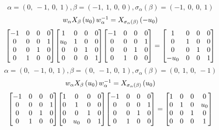 \documentclass[11pt]{article}
\theoremstyle{definition}
\begin{document}
\[
\alpha = \left( 0, \  -1, \  0, \  1\right), \beta = \left( -1, \  1, \  0, \  0\right), \sigma_{\alpha}(\beta) = \left( -1, \  0, \  0, \  1\right)
\]
\[
\scaletoalign{\textwidth}{w_{\alpha} X_{\beta}\left(u_{0}\right) w_{\alpha}^{-1} = X_{\sigma_{\alpha}\left(\beta\right)}\left(- u_{0}\right)}
\]
\[
\scaletoalign{\textwidth}{{\left[\begin{matrix}-1 & 0 & 0 & 0\\0 & 0 & 0 & 1\\0 & 0 & 1 & 0\\0 & 1 & 0 & 0\end{matrix}\right]} {\left[\begin{matrix}1 & 0 & 0 & 0\\u_{0} & 1 & 0 & 0\\0 & 0 & 1 & 0\\0 & 0 & 0 & 1\end{matrix}\right]} {\left[\begin{matrix}-1 & 0 & 0 & 0\\0 & 0 & 0 & 1\\0 & 0 & 1 & 0\\0 & 1 & 0 & 0\end{matrix}\right]} = {\left[\begin{matrix}1 & 0 & 0 & 0\\0 & 1 & 0 & 0\\0 & 0 & 1 & 0\\- u_{0} & 0 & 0 & 1\end{matrix}\right]}}
\]
\[
\alpha = \left( 0, \  -1, \  0, \  1\right), \beta = \left( 0, \  -1, \  0, \  1\right), \sigma_{\alpha}(\beta) = \left( 0, \  1, \  0, \  -1\right)
\]
\[
\scaletoalign{\textwidth}{w_{\alpha} X_{\beta}\left(u_{0}\right) w_{\alpha}^{-1} = X_{\sigma_{\alpha}\left(\beta\right)}\left(u_{0}\right)}
\]
\[
\scaletoalign{\textwidth}{{\left[\begin{matrix}-1 & 0 & 0 & 0\\0 & 0 & 0 & 1\\0 & 0 & 1 & 0\\0 & 1 & 0 & 0\end{matrix}\right]} {\left[\begin{matrix}1 & 0 & 0 & 0\\0 & 1 & 0 & 0\\0 & 0 & 1 & 0\\0 & u_{0} & 0 & 1\end{matrix}\right]} {\left[\begin{matrix}-1 & 0 & 0 & 0\\0 & 0 & 0 & 1\\0 & 0 & 1 & 0\\0 & 1 & 0 & 0\end{matrix}\right]} = {\left[\begin{matrix}1 & 0 & 0 & 0\\0 & 1 & 0 & u_{0}\\0 & 0 & 1 & 0\\0 & 0 & 0 & 1\end{matrix}\right]}}
\]
\end{document}
